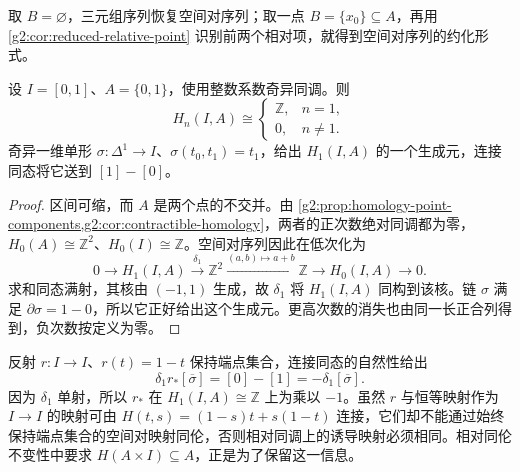 取 \(B=\varnothing\)，三元组序列恢复空间对序列；取一点 \(B=\{x_0\}\subseteq A\)，再用 \cref{g2:cor:reduced-relative-point} 识别前两个相对项，就得到空间对序列的约化形式。

\begin{example}\label{g2:exm:interval-relative-class}
	设 \(I=[0,1]\)、\(A=\{0,1\}\)，使用整数系数奇异同调。则
	\[
		H_n(I,A)\cong
		\begin{cases}
			\mathbb Z,&n=1,\\
			0,&n\ne1.
		\end{cases}
	\]
	奇异一维单形 \(\sigma:\Delta^1\to I\)、\(\sigma(t_0,t_1)=t_1\)，给出 \(H_1(I,A)\) 的一个生成元，连接同态将它送到 \([1]-[0]\)。
\end{example}
\begin{proof}
	区间可缩，而 \(A\) 是两个点的不交并。由 \cref{g2:prop:homology-point-components,g2:cor:contractible-homology}，两者的正次数绝对同调都为零，\(H_0(A)\cong\mathbb Z^2\)、\(H_0(I)\cong\mathbb Z\)。空间对序列因此在低次化为
	\[
		0\longrightarrow H_1(I,A)\xrightarrow{\delta_1}
		\mathbb Z^2\xrightarrow{(a,b)\mapsto a+b}\mathbb Z
		\longrightarrow H_0(I,A)\longrightarrow0.
	\]
	求和同态满射，其核由 \((-1,1)\) 生成，故 \(\delta_1\) 将 \(H_1(I,A)\) 同构到该核。链 \(\sigma\) 满足 \(\partial\sigma=1-0\)，所以它正好给出这个生成元。更高次数的消失也由同一长正合列得到，负次数按定义为零。
\end{proof}

反射 \(r:I\to I\)、\(r(t)=1-t\) 保持端点集合，连接同态的自然性给出
\[
	\delta_1 r_*[\overline\sigma]=[0]-[1]
	=-\delta_1[\overline\sigma].
\]
因为 \(\delta_1\) 单射，所以 \(r_*\) 在 \(H_1(I,A)\cong\mathbb Z\) 上为乘以 \(-1\)。虽然 \(r\) 与恒等映射作为 \(I\to I\) 的映射可由 \(H(t,s)=(1-s)t+s(1-t)\) 连接，它们却不能通过始终保持端点集合的空间对映射同伦，否则相对同调上的诱导映射必须相同。相对同伦不变性中要求 \(H(A\times I)\subseteq A\)，正是为了保留这一信息。
